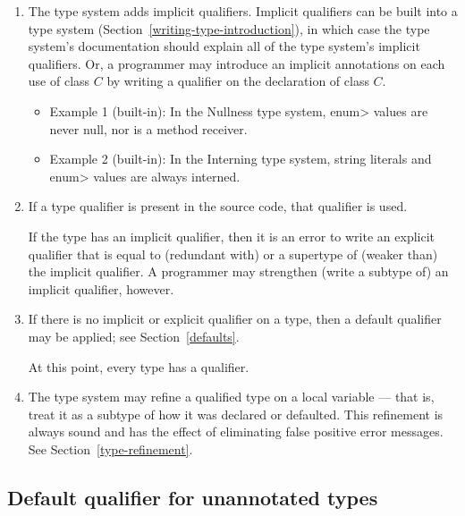 \begin{enumerate}
\item
  The type system adds implicit qualifiers.  Implicit qualifiers can be
  built into a type system (Section~\ref{writing-type-introduction}), in
  which case the type system's documentation should explain all of the type
  system's implicit qualifiers.  Or, a programmer may introduce an implicit
  annotations on each use of class $C$ by writing a qualifier on the
  declaration of class $C$.

\begin{itemize}
\item
  Example 1 (built-in):  In the Nullness type system,
  \<enum> values are never null, nor is a method receiver.
\item
  Example 2 (built-in):  In the Interning type system, string literals
  and \<enum> values are always interned.
\end{itemize}

\item
  If a type qualifier is present in the source code, that qualifier is used.

  If the type has an implicit qualifier, then it is an error to write an
  explicit qualifier that is equal to (redundant with) or a supertype of
  (weaker than) the implicit qualifier.  A programmer may strengthen
  (write a subtype of) an implicit qualifier, however.

\item
  If there is no implicit or explicit qualifier on a type, then a default
  qualifier may be applied; see Section~\ref{defaults}.

  \smallskip

  At this point, every type has a qualifier.

\item
  The type system may refine a qualified type on a local variable --- that
  is, treat it as a subtype of how it was declared or defaulted.  This
  refinement is always sound and has the effect of eliminating false
  positive error messages.  See Section~\ref{type-refinement}.


\end{enumerate}



\subsection{Default qualifier for unannotated types\label{defaults}}


